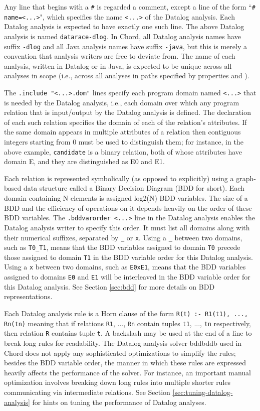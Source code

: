 Any line that begins with a {\tt \#} is regarded a comment, except a
line of the form ``{\tt \#} {\tt name=<...>}", which specifies the name
{\tt <...>} of the Datalog analysis.
Each Datalog analysis is expected to have exactly one such line.
The above Datalog analysis is named {\tt datarace-dlog}.
In Chord, all Datalog analysis names have suffix
{\tt -dlog} and all Java analysis names have suffix {\tt -java}, but
this is merely a convention that analysis writers are free to deviate from.
The name of each analysis, written in Datalog or in Java, is expected to be
unique across all analyses in scope (i.e., across all analyses in paths
specified by properties  and ).

The {\tt .include "<...>.dom"} lines specify each program domain named
{\tt <...>} that is needed by the Datalog analysis, i.e., each domain over which
any program relation that is input/output by the Datalog analysis is defined. 
The declaration of each such relation specifies the domain of each of the relation's attributes.
If the same domain appears in multiple attributes of a relation then
contiguous integers starting from 0 must be used to distinguish them; for instance,
in the above example, {\tt candidate} is a binary relation, both of whose
attributes have domain E, and they are distinguished as E0 and E1.

Each relation is represented symbolically (as opposed to explicitly)
using a graph-based data structure called a Binary Decision Diagram (BDD for short).
Each domain containing N elements is assigned log2(N) BDD variables.
The size of a BDD and the efficiency of operations on it depends heavily
on the order of these BDD variables.
The {\tt .bddvarorder <...>} line in the Datalog analysis enables the Datalog
analysis writer to specify this order.
It must list all domains along with their numerical suffixes, separated
by {\tt \_} or {\tt x}.
Using a {\tt \_} between two domains, such as {\tt T0\_T1}, means that the BDD variables assigned
to domain {\tt T0} precede those assigned to domain {\tt T1} in the BDD variable
order for this Datalog analysis.
Using a {\tt x} between two domains, such as {\tt E0xE1}, means that the
BDD variables assigned to domains {\tt E0} and {\tt E1}
will be interleaved in the BDD variable order for this Datalog analysis.
See Section \ref{sec:bdd} for more details on BDD representations.

Each Datalog analysis rule is a Horn clause of the form
{\tt R(t) :- R1(t1), ..., Rn(tn)}
meaning that if relations {\tt R1}, ..., {\tt Rn} contain tuples {\tt t1}, ..., {\tt tn}
respectively, then relation {\tt R} contains tuple {\tt t}.
A backslash may be used at the end of a line to break long rules for readability.
The Datalog analysis solver bddbddb used in Chord does not apply any
sophisticated optimizations to simplify the rules; besides the BDD variable order,
the manner in which these rules are expressed heavily affects the performance of
the solver.  For instance, an important manual optimization involves breaking down
long rules into multiple shorter rules communicating via intermediate relations.
See Section \ref{sec:tuning-datalog-analysis} for hints on tuning the performance
of Datalog analyses.

